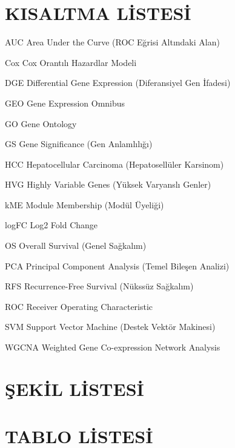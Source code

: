 \documentclass[12pt,a4paper,oneside]{report}
\renewcommand{\listfigurename}{ŞEKİL LİSTESİ}
\renewcommand{\listtablename}{TABLO LİSTESİ}
\begin{document}
\chapter*{KISALTMA LİSTESİ}
\vspace{-0.3em}
\begin{abbrv}
\item[AUC] Area Under the Curve (ROC Eğrisi Altındaki Alan)
\item[Cox] Cox Orantılı Hazardlar Modeli
\item[DGE] Differential Gene Expression (Diferansiyel Gen İfadesi)
\item[GEO] Gene Expression Omnibus
\item[GO] Gene Ontology
\item[GS] Gene Significance (Gen Anlamlılığı)
\item[HCC] Hepatocellular Carcinoma (Hepatosellüler Karsinom)
\item[HVG] Highly Variable Genes (Yüksek Varyanslı Genler)
\item[kME] Module Membership (Modül Üyeliği)
\item[logFC] Log2 Fold Change
\item[OS] Overall Survival (Genel Sağkalım)
\item[PCA] Principal Component Analysis (Temel Bileşen Analizi)
\item[RFS] Recurrence-Free Survival (Nükssüz Sağkalım)
\item[ROC] Receiver Operating Characteristic
\item[SVM] Support Vector Machine (Destek Vektör Makinesi)
\item[WGCNA] Weighted Gene Co-expression Network Analysis
\end{abbrv}
\clearpage

\chapter*{ŞEKİL LİSTESİ}
\renewcommand\listfigurename{\vspace{-3.2em}}
\listoffigures
\clearpage

\chapter*{TABLO LİSTESİ}
\renewcommand\listtablename{\vspace{-3.2em}}
\listoftables
\clearpage
\end{document}
